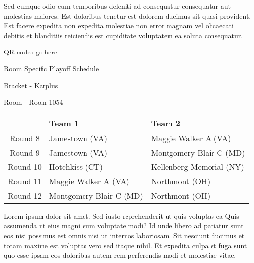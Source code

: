 \documentclass{article}%
\begin{document}
\newline%
Sed cumque odio eum temporibus deleniti ad consequatur consequatur aut molestias maiores. Est doloribus tenetur est dolorem ducimus sit quasi provident. Est facere expedita non expedita molestiae non error magnam vel obcaecati debitis et blanditiis reiciendis est cupiditate voluptatem ea soluta consequatur.%
\vspace*{140pt}%
\begin{center}%
\begin{Huge}%
QR codes go here%
\end{Huge}%
\end{center}%
\newpage%
\begin{center}%
\begin{Huge}%
Room Specific Playoff Schedule%
\end{Huge}%
\vspace*{8pt}%
\linebreak%
\begin{Large}%
Bracket {-} Karplus%
\end{Large}%
\vspace*{8pt}%
\linebreak%
\vspace*{8pt}%
\begin{Large}%
Room {-} Room 1054%
\end{Large}%
\end{center}%
%
\begin{tabularx}{\textwidth}{|c|Y|Y|}%
\hline%
&Team 1&Team 2\\%
\hline%
Round 8&Jamestown (VA)&Maggie Walker A (VA)\\%
Round 9&Jamestown (VA)&Montgomery Blair C (MD)\\%
Round 10&Hotchkiss (CT)&Kellenberg Memorial (NY)\\%
Round 11&Maggie Walker A (VA)&Northmont (OH)\\%
Round 12&Montgomery Blair C (MD)&Northmont (OH)\\%
\hline%
\end{tabularx}%
\vspace*{8pt}%
\newline%
Lorem ipsum dolor sit amet. Sed iusto reprehenderit ut quis voluptas ea Quis assumenda ut eius magni eum voluptate modi? Id unde libero ad pariatur sunt eos nisi possimus est omnis nisi ut internos laboriosam. Sit nesciunt ducimus et totam maxime est voluptas vero sed itaque nihil. Et expedita culpa et fuga sunt quo esse ipsam eos doloribus autem rem perferendis modi et molestiae vitae.\newline%
\end{document}
